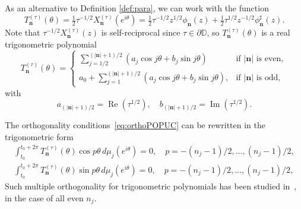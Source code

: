 \documentclass[reqno,centertags,11pt,draft]{amsart}
\newcommand{\T}{\mathbb{\partial\mathbb{D}}}
\DeclareMathOperator{\re}{Re}
\DeclareMathOperator{\im}{Im}
\begin{document}
As an alternative to Definition \ref{def:para}, we can work with the function
\begin{equation}
    T_{\bm{n}}^{(\tau)}(\theta)
    =\tfrac12 \tau^{-1/2}X_{\bm{n}}^{(\tau)}(e^{i\theta})
    =
    \tfrac12\tau^{-1/2} z^{1/2}\phi_{\bm{n}}(z) + \tfrac12\tau^{1/2} z^{-1/2}\phi_{\bm{n}}^\sharp(z)
    .
\end{equation}
Note that $\tau^{-1/2}X_{\bm{n}}^{(\tau)}(z)$ is self-reciprocal since $\tau\in\T$, so $T_{\bm{n}}^{(\tau)}(\theta)$ is a real trigonometric polynomial
\begin{equation}\label{eq:trigPOPUC}
    T_{\bm{n}}^{(\tau)}(\theta)
    =
    \begin{cases}
         \sum_{j=1/2}^{(|\bm{n}|+1)/2}  \left( a_j \cos j\theta +b_j\sin j\theta \right)
         & \mbox{if } |\bm{n}| \mbox{ is even},
         \\
          a_0+ \sum_{j=1}^{(|\bm{n}|+1)/2} \left( a_j \cos j\theta +b_j\sin j\theta \right),  & \mbox{if } |\bm{n}| \mbox{ is odd},
    \end{cases}
\end{equation}
with
\begin{equation}\label{eq:trigPOPUC2}
    a_{(|\bm{n}|+1)/2} = \re(\tau^{1/2})
    ,
    \quad
    b_{(|\bm{n}|+1)/2} =\im(\tau^{1/2}).
\end{equation}



The orthogonality conditions~\eqref{eq:orthoPOPUC} can be rewritten in the trigonometric form
\begin{align}\label{eq:orthoTrigPOPUC}
    \int_{t_0}^{t_0+2\pi} T_{\bm{n}}^{(\tau)}(\theta) \cos p\theta \, d\mu_j(e^{i\theta}) = 0, \quad 
    p = -(n_j-1)/2,\dots,(n_j-1)/2,\\
    \label{eq:orthoTrigPOPUC2}
    \int_{t_0}^{t_0+2\pi} T_{\bm{n}}^{(\tau)}(\theta) \sin p\theta \, d\mu_j(e^{i\theta}) = 0, \quad p = -(n_j-1)/2,\dots,(n_j-1)/2,
\end{align}
Such multiple orthogonality for trigonometric polynomials has been studied in~\cite{Mil}, in the case of all even $n_j$.
\end{document}

